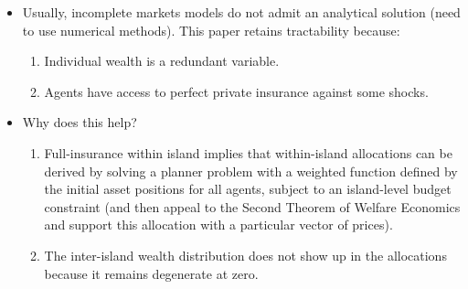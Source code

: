 \documentclass[notes=show]{beamer}
\begin{document}
\bigskip

\begin{frame}%


\begin{itemize}
\item Usually, incomplete markets models do not admit an analytical solution
(need to use numerical methods). This paper retains tractability because:

\begin{enumerate}
\item Individual wealth is a redundant variable.

\item Agents have access to perfect private insurance against some shocks.
\end{enumerate}

\item Why does this help?

\begin{enumerate}
\item Full-insurance within island implies that within-island allocations
can be derived by solving a planner problem with a weighted function defined
by the initial asset positions for all agents, subject to an island-level
budget constraint (and then appeal to the Second Theorem of Welfare
Economics and support this allocation with a particular vector of prices).

\item The inter-island wealth distribution does not show up in the
allocations because it remains degenerate at zero.
\end{enumerate}
\end{itemize}

\transboxout%
\end{frame}%

\bigskip
\end{document}
